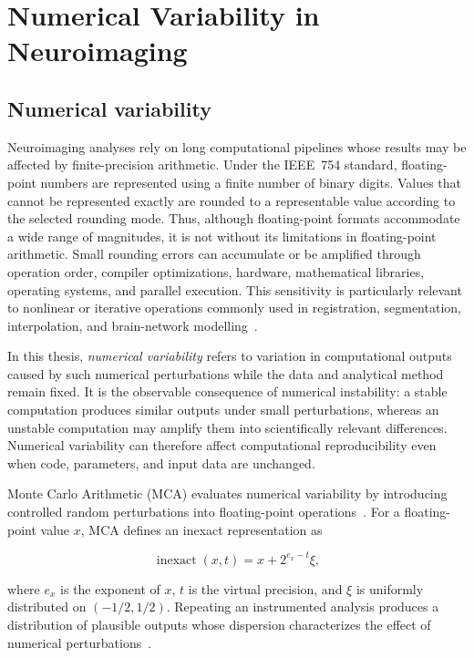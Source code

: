 \chapter{Numerical Variability in Neuroimaging}
\label{chap:background}

\section{Numerical variability}

Neuroimaging analyses rely on long computational pipelines whose results may be affected by finite-precision arithmetic. Under the IEEE~754 standard, floating-point numbers are represented using a finite number of binary digits. Values that cannot be represented exactly are rounded to a representable value according to the selected rounding mode. Thus, although floating-point formats accommodate a wide range of magnitudes, it is not without its limitations in floating-point arithmetic. Small rounding errors can accumulate or be amplified through operation order, compiler optimizations, hardware, mathematical libraries, operating systems, and parallel execution. This sensitivity is particularly relevant to nonlinear or iterative operations commonly used in registration, segmentation, interpolation, and brain-network modelling~\cite{Glatard2015,Kiar2020,Salari2021}.

In this thesis, \emph{numerical variability} refers to variation in computational outputs caused by such numerical perturbations while the data and analytical method remain fixed. It is the observable consequence of numerical instability: a stable computation produces similar outputs under small perturbations, whereas an unstable computation may amplify them into scientifically relevant differences. Numerical variability can therefore affect computational reproducibility even when code, parameters, and input data are unchanged.

Monte Carlo Arithmetic (MCA) evaluates numerical variability by introducing controlled random perturbations into floating-point operations~\cite{Parker1997MCA,Salari2021}. For a floating-point value $x$, MCA defines an inexact representation as

\begin{equation}
  \operatorname{inexact}(x,t)=x+2^{e_x-t}\xi,
  \label{eq:mca-general}
\end{equation}

where $e_x$ is the exponent of $x$, $t$ is the virtual precision, and $\xi$ is uniformly distributed on $(-1/2,1/2)$. Repeating an instrumented analysis produces a distribution of plausible outputs whose dispersion characterizes the effect of numerical perturbations~\cite{Denis2016Verificarlo,Kiar2021}.

